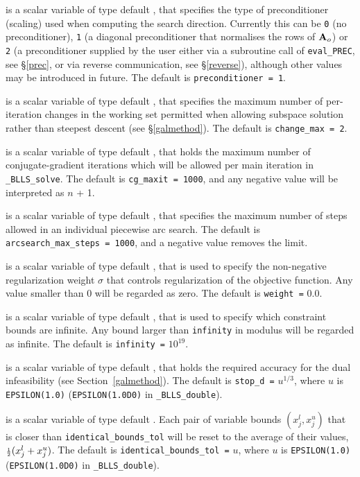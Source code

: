 \documentclass{galahad}
\newcommand{\packagename}{BLLS}
\newcommand{\fullpackagename}{\libraryname\_\packagename}
\newcommand{\solver}{{\tt \fullpackagename\_solve}}
\begin{document}
\begin{description}
 is a scalar variable of type default \integer, that
specifies the type of preconditioner (scaling) used when computing the
search direction. Currently this can be 
{\tt 0} (no preconditioner), 
{\tt 1} (a diagonal preconditioner that normalises the rows of ${\mathbf{A}}_o$) or
{\tt 2} (a preconditioner supplied by the user either via a subroutine
call of {\tt eval\_PREC}, see \S\ref{prec}, or via reverse communication, 
see \S\ref{reverse}),
although other values may be introduced
in future. The default is {\tt preconditioner = 1}.

 is a scalar variable of type default \integer, that
specifies the maximum number of per-iteration changes in the working set
permitted when allowing subspace solution rather than steepest descent
(see \S\ref{galmethod}).
The default is {\tt change\_max = 2}.

 is a scalar variable of type default \integer, that holds the
maximum number of conjugate-gradient iterations which will be allowed
per main iteration in \solver.
The default is {\tt cg\_maxit = 1000}, and any negative value will
be interpreted as $n$ + 1.

 is a scalar variable of type default \integer,
that specifies the maximum number of steps allowed in an individual
piecewise arc search.
The default is {\tt arcsearch\_max\_steps = 1000}, and a negative value
removes the limit.

 is a scalar variable of type default \realdp, that is used to
specify the non-negative regularization weight $\sigma$ that controls 
regularization of the objective function. Any value smaller than $0$ will
be regarded as zero.
The default is {\tt weight =} $0.0$.

 is a scalar variable of type default \realdp, that is used to
specify which constraint bounds are infinite.
Any bound larger than {\tt infinity} in modulus will be regarded as infinite.
The default is {\tt infinity =} $10^{19}$.

 is a scalar variable of type default
\realdp, that holds the
required accuracy for the dual infeasibility (see Section~\ref{galmethod}).
The default is {\tt stop\_d =} $u^{1/3}$,
where $u$ is {\tt EPSILON(1.0)} ({\tt EPSILON(1.0D0)} in
{\tt \fullpackagename\_double}).

is a scalar variable of type default \realdp.
Each pair of variable bounds $(x_{j}^{l}, x_{j}^{u})$
that is closer than {\tt identical\_bounds\_tol}
will be reset to the average of their values,
${\scriptstyle \frac{1}{2}} (x_{j}^{l} + x_{j}^{u})$.
The default is {\tt identical\_bounds\_tol =} $u$,
where $u$ is {\tt EPSILON(1.0)} ({\tt EPSILON(1.0D0)} in
{\tt \fullpackagename\_double}).


\end{description}
\end{document}
